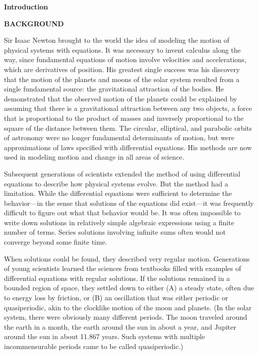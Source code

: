 \documentclass{article}
\begin{document}
\textbf{Introduction}

\hfill

\textbf{BACKGROUND}

\hfill

Sir Isaac Newton brought to the world the idea of modeling the motion of
physical systems with equations. It was necessary to invent calculus along the
way, since fundamental equations of motion involve velocities and accelerations,
which are derivatives of position. His greatest single success was his discovery that
the motion of the planets and moons of the solar system resulted from a single
fundamental source: the gravitational attraction of the bodies. He demonstrated
that the observed motion of the planets could be explained by assuming that there
is a gravitational attraction between any two objects, a force that is proportional
to the product of masses and inversely proportional to the square of the distance
between them. The circular, elliptical, and parabolic orbits of astronomy were
no longer fundamental determinants of motion, but were approximations of laws
specified with differential equations. His methods are now used in modeling
motion and change in all areas of science.

Subsequent generations of scientists extended the method of using differential
equations to describe how physical systems evolve. But the method had
a limitation. While the differential equations were sufficient to determine the
behavior—in the sense that solutions of the equations did exist—it was frequently
difficult to figure out what that behavior would be. It was often impossible to write
down solutions in relatively simple algebraic expressions using a finite number of
terms. Series solutions involving infinite sums often would not converge beyond
some finite time.

When solutions could be found, they described very regular motion. Generations
of young scientists learned the sciences from textbooks filled with examples
of differential equations with regular solutions. If the solutions remained in
a bounded region of space, they settled down to either (A) a steady state, often
due to energy loss by friction, or (B) an oscillation that was either periodic or
quasiperiodic, akin to the clocklike motion of the moon and planets. (In the solar
system, there were obviously many different periods. The moon traveled around
the earth in a month, the earth around the sun in about a year, and Jupiter around
the sun in about 11.867 years. Such systems with multiple incommensurable
periods came to be called quasiperiodic.)
\end{document}

